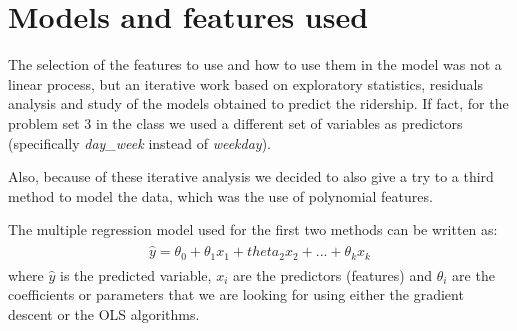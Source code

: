 \documentclass[a4paper,12pt,english]{sphinxmanual}
\begin{document}
\section{Models and features used}
\label{section2:models-and-features-used}
The selection of the features to use and how to use them in the model was not
a linear process, but an iterative work based on exploratory statistics, residuals
analysis and study of the models obtained to predict the ridership. If fact,
for the problem set 3 in the class we used a different set of variables as
predictors (specifically \emph{day\_week} instead of \emph{weekday}).

Also, because of these iterative analysis we decided to also give a try to a
third method to model the data, which was the use of polynomial features.

The multiple regression model used for the first two methods can be written as:
\label{section2:multreg-mod}\label{section2:equation-multreg_mod}\begin{gather}
\begin{split}\hat y = \theta_0 + \theta_1 x_1 + theta_2 x_2 + ... + \theta_k x_k\end{split}\label{section2-multreg_mod}
\end{gather}
where \(\hat y\) is the predicted variable, \(x_i\) are the predictors
(features) and \(\theta_i\) are the coefficients or parameters that we are
looking for using either the gradient descent or the OLS algorithms.
\end{document}

